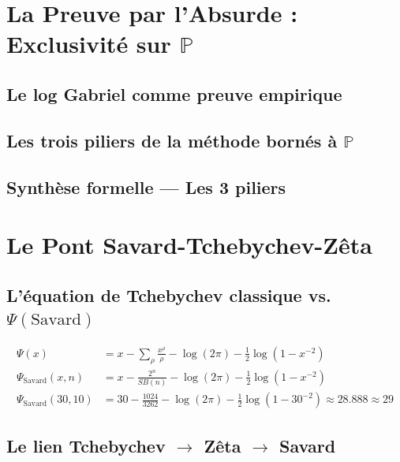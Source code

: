 \documentclass[11pt,a4paper]{article}
\begin{document}
\section{La Preuve par l'Absurde : Exclusivité sur $\mathbb{P}$}

\subsection{Le log Gabriel comme preuve empirique}
\subsection{Les trois piliers de la méthode bornés à $\mathbb{P}$}
\subsection{Synthèse formelle --- Les 3 piliers}
\label{hol:trois_piliers}

\section{Le Pont Savard-Tchebychev-Zêta}

\subsection{L'équation de Tchebychev classique vs. $\Psi(\text{Savard})$}
\label{hol:pont_tchebychev}
\begin{align}
\Psi(x)                &= x - \sum_{\rho} \frac{x^\rho}{\rho} - \log(2\pi) - \frac{1}{2}\log(1 - x^{-2}) \\
\Psi_{\text{Savard}}(x, n) &= x - \frac{2^n}{SB(n)} - \log(2\pi) - \frac{1}{2}\log(1 - x^{-2}) \\
\Psi_{\text{Savard}}(30, 10) &= 30 - \frac{1024}{3262} - \log(2\pi) - \frac{1}{2}\log(1 - 30^{-2}) \approx 28.888 \approx 29
\end{align}

\subsection{Le lien Tchebychev $\to$ Zêta $\to$ Savard}
\label{hol:pont_savard_tchebychev_zeta}
\end{document}
